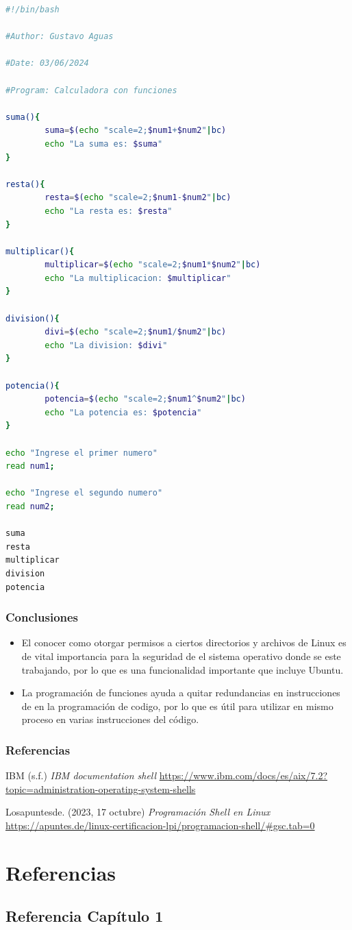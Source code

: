 \documentclass[11pt,twoside]{book}
\begin{document}
\begin{lstlisting}[language=bash, caption={Calculadora con funciones}]
#!/bin/bash

#Author: Gustavo Aguas

#Date: 03/06/2024

#Program: Calculadora con funciones

suma(){
        suma=$(echo "scale=2;$num1+$num2"|bc)
        echo "La suma es: $suma"
}

resta(){
        resta=$(echo "scale=2;$num1-$num2"|bc)
        echo "La resta es: $resta"
}

multiplicar(){
        multiplicar=$(echo "scale=2;$num1*$num2"|bc)
        echo "La multiplicacion: $multiplicar"
}

division(){
        divi=$(echo "scale=2;$num1/$num2"|bc)
        echo "La division: $divi"
}

potencia(){
        potencia=$(echo "scale=2;$num1^$num2"|bc)
        echo "La potencia es: $potencia"
}

echo "Ingrese el primer numero"
read num1;

echo "Ingrese el segundo numero"
read num2;

suma
resta
multiplicar
division
potencia
\end{lstlisting}
\subsection*{Conclusiones}
\begin{itemize}  
  \item El conocer como otorgar permisos a ciertos directorios y archivos de Linux es de vital importancia para la seguridad de el sistema operativo donde se este trabajando, por lo que es una funcionalidad importante que incluye Ubuntu.
  \item La programación de funciones ayuda a quitar redundancias en instrucciones de en la programación de codigo, por lo que es útil para utilizar en mismo proceso en varias instrucciones del código.
\end{itemize}

\subsection*{Referencias}

IBM (s.f.) \textit{IBM documentation shell} \url{https://www.ibm.com/docs/es/aix/7.2?topic=administration-operating-system-shells}
    
Losapuntesde. (2023, 17 octubre) \textit{Programación Shell en Linux} \url{https://apuntes.de/linux-certificacion-lpi/programacion-shell/#gsc.tab=0}

\chapter{Referencias}
\section{Referencia Capítulo 1}
\nocite{barnes2021}
\nocite{walat2017}
\nocite{herlein2017}
\printbibliography[heading=none]
\end{document}
